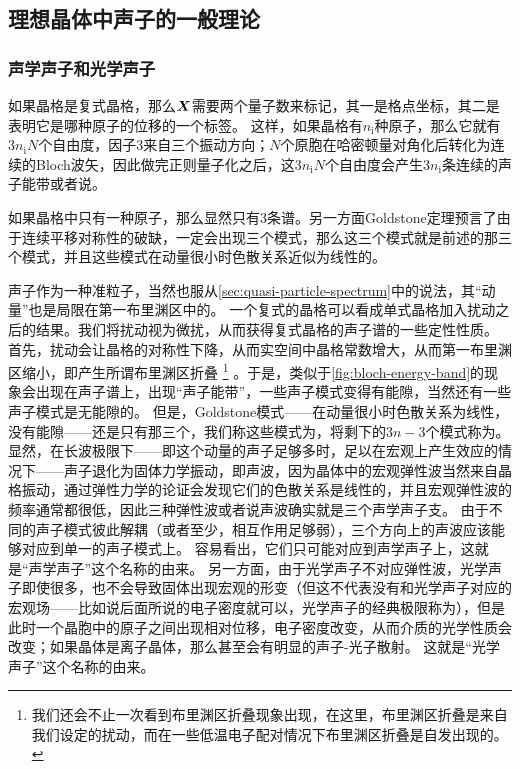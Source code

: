 \subsection{理想晶体中声子的一般理论}

\subsubsection{声学声子和光学声子}

如果晶格是复式晶格，那么$\vb*{X}$需要两个量子数来标记，其一是格点坐标，其二是表明它是哪种原子的位移的一个标签。
这样，如果晶格有$n_\text{i}$种原子，那么它就有$3n_\text{i} N$个自由度，因子$3$来自三个振动方向；$N$个原胞在哈密顿量对角化后转化为连续的Bloch波矢，因此做完正则量子化之后，这$3n_\text{i} N$个自由度会产生$3n_\text{i}$条连续的声子能带或者说。

如果晶格中只有一种原子，那么显然只有$3$条谱。另一方面Goldstone定理预言了由于连续平移对称性的破缺，一定会出现三个模式，那么这三个模式就是前述的那三个模式，并且这些模式在动量很小时色散关系近似为线性的。

声子作为一种准粒子，当然也服从\autoref{sec:quasi-particle-spectrum}中的说法，其“动量”也是局限在第一布里渊区中的。
一个复式的晶格可以看成单式晶格加入扰动之后的结果。我们将扰动视为微扰，从而获得复式晶格的声子谱的一些定性性质。
首先，扰动会让晶格的对称性下降，从而实空间中晶格常数增大，从而第一布里渊区缩小，即产生所谓布里渊区折叠%
\footnote{
    我们还会不止一次看到布里渊区折叠现象出现，在这里，布里渊区折叠是来自我们设定的扰动，而在一些低温电子配对情况下布里渊区折叠是自发出现的。
}%
。于是，类似于\autoref{fig:bloch-energy-band}的现象会出现在声子谱上，出现“声子能带”，一些声子模式变得有能隙，当然还有一些声子模式是无能隙的。
但是，Goldstone模式——在动量很小时色散关系为线性，没有能隙——还是只有那三个，我们称这些模式为，将剩下的$3n-3$个模式称为。
显然，在长波极限下——即这个动量的声子足够多时，足以在宏观上产生效应的情况下——声子退化为固体力学振动，即声波，因为晶体中的宏观弹性波当然来自晶格振动，通过弹性力学的论证会发现它们的色散关系是线性的，并且宏观弹性波的频率通常都很低，因此三种弹性波或者说声波确实就是三个声学声子支。
由于不同的声子模式彼此解耦（或者至少，相互作用足够弱），三个方向上的声波应该能够对应到单一的声子模式上。
容易看出，它们只可能对应到声学声子上，这就是“声学声子”这个名称的由来。
另一方面，由于光学声子不对应弹性波，光学声子即使很多，也不会导致固体出现宏观的形变（但这不代表没有和光学声子对应的宏观场——比如说后面所说的电子密度就可以，光学声子的经典极限称为），但是此时一个晶胞中的原子之间出现相对位移，电子密度改变，从而介质的光学性质会改变；如果晶体是离子晶体，那么甚至会有明显的声子-光子散射。
这就是“光学声子”这个名称的由来。

